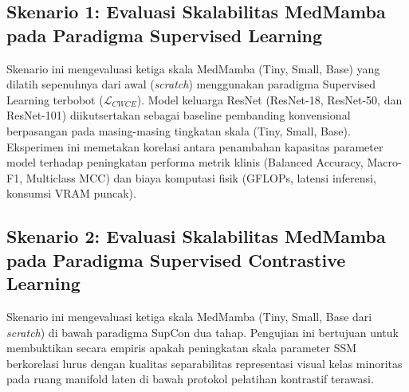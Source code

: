 \subsection{Skenario 1: Evaluasi Skalabilitas MedMamba pada Paradigma Supervised Learning}
Skenario ini mengevaluasi ketiga skala MedMamba (Tiny, Small, Base) yang dilatih sepenuhnya dari awal (\textit{scratch}) menggunakan paradigma Supervised Learning terbobot ($\mathcal{L}_{CWCE}$). Model keluarga ResNet (ResNet-18, ResNet-50, dan ResNet-101) diikutsertakan sebagai baseline pembanding konvensional berpasangan pada masing-masing tingkatan skala (Tiny, Small, Base). Eksperimen ini memetakan korelasi antara penambahan kapasitas parameter model terhadap peningkatan performa metrik klinis (Balanced Accuracy, Macro-F1, Multiclass MCC) dan biaya komputasi fisik (GFLOPs, latensi inferensi, konsumsi VRAM puncak).

\subsection{Skenario 2: Evaluasi Skalabilitas MedMamba pada Paradigma Supervised Contrastive Learning}
Skenario ini mengevaluasi ketiga skala MedMamba (Tiny, Small, Base dari \textit{scratch}) di bawah paradigma SupCon dua tahap. Pengujian ini bertujuan untuk membuktikan secara empiris apakah peningkatan skala parameter SSM berkorelasi lurus dengan kualitas separabilitas representasi visual kelas minoritas pada ruang manifold laten di bawah protokol pelatihan kontrastif terawasi.

